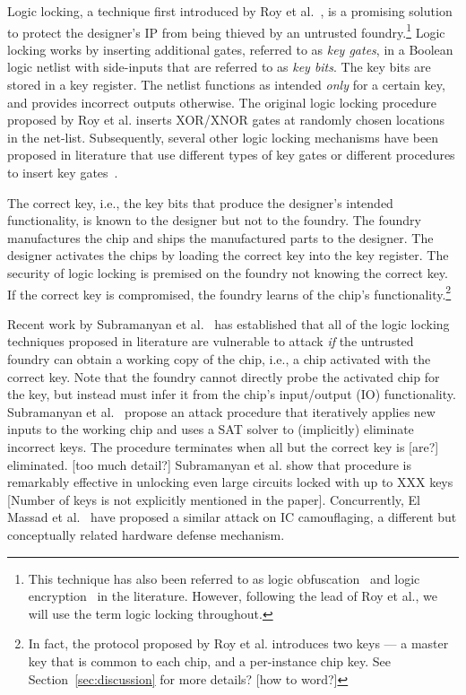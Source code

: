 Logic locking, a technique first introduced by Roy et al.~\cite{roy2008epic}, 
is a promising solution to protect the designer's IP from 
being thieved by an untrusted foundry.\footnote{This technique has 
also been referred to as logic obfuscation~\cite{rajendran2012security} and logic encryption~\cite{dupuis2014novel,rajendran2012logic,rajendran2015fault} in the literature. However, following the lead of Roy et al., we will use the term logic locking throughout.}  
Logic locking works by inserting 
additional gates, referred to as \emph{key gates}, 
in a Boolean 
logic netlist with 
side-inputs that are referred to as \emph{key bits}. The key bits 
are 
stored in a key register. 
The netlist functions as intended \emph{only} 
for a certain key, and provides incorrect
outputs otherwise. 
The original logic locking procedure proposed by Roy et al. 
inserts XOR/XNOR gates at randomly chosen locations in the 
net-list. Subsequently, several other logic locking mechanisms have been proposed in literature that use different types of key gates or 
different procedures to insert key gates~\cite{rajendran2012security,rajendran2012logic,rajendran2015fault,plaza2015solving,dupuis2014novel,chakraborty2009harpoon}. 

The correct key, i.e., 
the key bits that produce the designer's intended 
functionality, 
is known to the designer but not to the foundry. The foundry manufactures the chip and ships the manufactured parts to the 
designer. The designer activates the chips by loading the 
correct key into the key register. 
The security of logic locking 
is premised on the foundry not knowing the correct key.
If the correct key is compromised, the foundry learns of the 
chip's functionality.\footnote{In fact, the protocol proposed by Roy et al. introduces two keys --- a master key that is common to each chip, and a per-instance chip key. See Section~\ref{sec:discussion} for more details? [how to word?]} 

  
Recent work by Subramanyan et al.~\cite{subramanyan2015evaluating} has 
established 
that all
of the logic locking techniques proposed in literature
are vulnerable to attack \emph{if} the 
untrusted foundry can obtain a 
working copy of the chip, i.e., 
a chip activated with the correct key. 
Note that the foundry cannot directly 
probe the activated chip for the key, but instead 
must infer it from 
the chip's input/output (IO) functionality.   
Subramanyan
et al.~\cite{subramanyan2015evaluating} propose an attack procedure that 
iteratively applies new inputs to the working chip and 
uses a SAT solver to 
(implicitly) eliminate incorrect keys. 
The procedure terminates when 
all but the correct key is [are?] eliminated. 
[too much detail?]
Subramanyan et al. show that procedure is 
remarkably effective in unlocking even large circuits locked 
with up to XXX keys [Number of keys is not explicitly mentioned in the paper]. Concurrently, El Massad et al.~\cite{el2015integrated} 
have proposed a similar attack on IC camouflaging, 
a different but conceptually related hardware 
defense mechanism.

